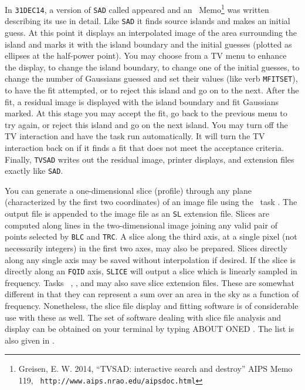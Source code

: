 In {\tt 31DEC14}, a version of {\tt SAD} called {\tt {}}
appeared and an \AIPS\ Memo\footnote{Greisen, E. W. 2014, ``TVSAD:
interactive search and destroy'' AIPS Memo 119, {\tt
http://www.aips.nrao.edu/aipsdoc.html}} was written describing its use
in detail.  Like {\tt SAD} it finds source islands and makes an initial
guess.  At this point it displays an interpolated image of the area
surrounding the island and marks it with the island boundary and the
initial guesses (plotted as ellipses at the half-power point).  You
may choose from a TV menu to enhance the display, to change the island
boundary, to change one of the initial guesses, to change the number
of Gaussians guessed and set their values (like verb {\tt MFITSET}),
to have the fit attempted, or to reject this island and go on to the
next.  After the fit, a residual image is displayed with the island
boundary and fit Gaussians marked.  At this stage you may accept the
fit, go back to the previous menu to try again, or reject this island
and go on the next island.  You may turn off the TV interaction and
have the task run automatically.  It will turn the TV interaction back
on if it finds a fit that does not meet the acceptance criteria.
Finally, {\tt TVSAD} writes out the residual image, printer displays,
and extension files exactly like {\tt SAD}\@.


     You can generate a one-dimensional slice (profile) through any
plane (characterized by the first two coordinates) of an image file
using the \AIPS\ task {\tt {}}\@. The output file is appended
to the image file as an {\tt SL} extension file. Slices are computed
along lines in the two-dimensional image joining any valid pair of
points selected by {\tt BLC} and \hbox{{\tt TRC}}.  A slice along the
third axis, at a single pixel (not necessarily integers) in the
first two axes, may also be prepared.  Slices directly along any
single axis may be saved without interpolation if desired.  If the
slice is directly along an {\tt FQID} axis, {\tt SLICE} will output a
slice which is linearly sampled in frequency.  Tasks {\tt
{}}, {\tt {}}, and {\tt {}} may also
save slice extension files.  These are somewhat different in that they
can represent a sum over an area in the sky as a function of
frequency.  Nonetheless, the slice file display and fitting software
is of considerable use with these as well.  The set of software
dealing with slice file analysis and display can be obtained on your
terminal by typing {\us ABOUT ONED \hbox{\CR}}.  The list is also
given in .

